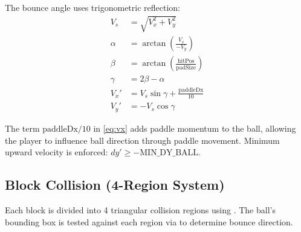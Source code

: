 \documentclass[11pt,a4paper]{article}
\begin{document}
The bounce angle uses trigonometric reflection:
\begin{align}
  V_s &= \sqrt{V_x^2 + V_y^2} \label{eq:speed} \\
  \alpha &= \arctan\!\left(\frac{V_x}{-V_y}\right) \label{eq:angle} \\
  \beta &= \arctan\!\left(\frac{\text{hitPos}}{\text{padSize}}\right) \label{eq:reflect} \\
  \gamma &= 2\beta - \alpha \label{eq:new-angle} \\
  V_x' &= V_s \sin\gamma + \frac{\text{paddleDx}}{10} \label{eq:vx} \\
  V_y' &= -V_s \cos\gamma \label{eq:vy}
\end{align}

The term $\text{paddleDx}/10$ in \cref{eq:vx} adds paddle momentum to the ball, allowing the player to influence ball direction through paddle movement. Minimum upward velocity is enforced: $dy' \geq -\text{MIN\_DY\_BALL}$.

\subsection{Block Collision (4-Region System)}
\label{sec:block-collision}

Each block is divided into 4 triangular collision regions using . The ball's bounding box is tested against each region via  to determine bounce direction.
\end{document}
